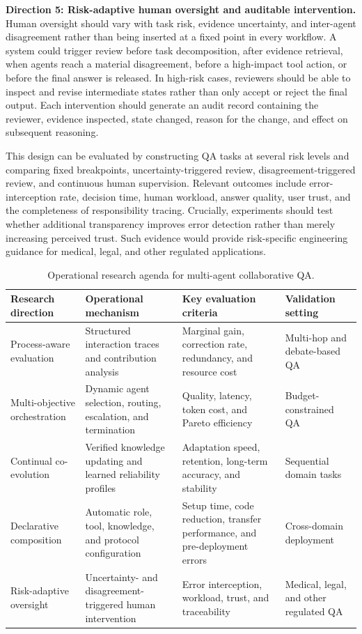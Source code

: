 \textbf{Direction 5: Risk-adaptive human oversight and auditable
intervention.}
Human oversight should vary with task risk, evidence uncertainty, and
inter-agent disagreement rather than being inserted at a fixed point in every
workflow. A system could trigger review before task decomposition, after
evidence retrieval, when agents reach a material disagreement, before a
high-impact tool action, or before the final answer is released. In
high-risk cases, reviewers should be able to inspect and revise intermediate
states rather than only accept or reject the final output. Each intervention
should generate an audit record containing the reviewer, evidence inspected,
state changed, reason for the change, and effect on subsequent reasoning.

This design can be evaluated by constructing QA tasks at several risk levels
and comparing fixed breakpoints, uncertainty-triggered review,
disagreement-triggered review, and continuous human supervision. Relevant
outcomes include error-interception rate, decision time, human workload,
answer quality, user trust, and the completeness of responsibility tracing.
Crucially, experiments should test whether additional transparency improves
error detection rather than merely increasing perceived trust. Such evidence
would provide risk-specific engineering guidance for medical, legal, and
other regulated applications.

\begin{table}[pos=t]
  \centering
  \caption{Operational research agenda for multi-agent collaborative QA.}
  \label{tab:research_agenda}
  \small
  \begin{tabularx}{\textwidth}{p{2.8cm} X p{3.5cm} p{3.1cm}}
    \toprule
    \textbf{Research direction} &
    \textbf{Operational mechanism} &
    \textbf{Key evaluation criteria} &
    \textbf{Validation setting} \\
    \midrule
    Process-aware evaluation &
    Structured interaction traces and contribution analysis &
    Marginal gain, correction rate, redundancy, and resource cost &
    Multi-hop and debate-based QA \\[2pt]
    Multi-objective orchestration &
    Dynamic agent selection, routing, escalation, and termination &
    Quality, latency, token cost, and Pareto efficiency &
    Budget-constrained QA \\[2pt]
    Continual co-evolution &
    Verified knowledge updating and learned reliability profiles &
    Adaptation speed, retention, long-term accuracy, and stability &
    Sequential domain tasks \\[2pt]
    Declarative composition &
    Automatic role, tool, knowledge, and protocol configuration &
    Setup time, code reduction, transfer performance, and pre-deployment errors &
    Cross-domain deployment \\[2pt]
    Risk-adaptive oversight &
    Uncertainty- and disagreement-triggered human intervention &
    Error interception, workload, trust, and traceability &
    Medical, legal, and other regulated QA \\
    \bottomrule
  \end{tabularx}
\end{table}

